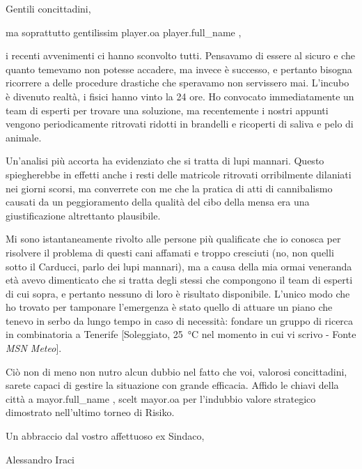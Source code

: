 \documentclass{letter}
\date{28 febbraio 2018}
\begin{document}
\begin{letter}{}
\opening{Gentili concittadini,}

ma soprattutto gentilissim{{ player.oa }} {{ player.full_name }},

i recenti avvenimenti ci hanno sconvolto tutti. Pensavamo di essere al sicuro e che quanto temevamo non potesse accadere, ma invece è successo, e pertanto bisogna ricorrere a delle procedure drastiche che speravamo non servissero mai. L'incubo è divenuto realtà, i fisici hanno vinto la 24 ore. Ho convocato immediatamente un team di esperti per trovare una soluzione, ma recentemente i nostri appunti vengono periodicamente ritrovati ridotti in brandelli e ricoperti di saliva e pelo di animale.

Un'analisi più accorta ha evidenziato che si tratta di lupi mannari. Questo spiegherebbe in effetti anche i resti delle matricole ritrovati orribilmente dilaniati nei giorni scorsi, ma converrete con me che la pratica di atti di cannibalismo causati da un peggioramento della qualità del cibo della mensa era una giustificazione altrettanto plausibile.

Mi sono istantaneamente rivolto alle persone più qualificate che io conosca per risolvere il problema di questi cani affamati e troppo cresciuti (no, non quelli sotto il Carducci, parlo dei lupi mannari), ma a causa della mia ormai veneranda età avevo dimenticato che si tratta degli stessi che compongono il team di esperti di cui sopra, e pertanto nessuno di loro è risultato disponibile. L'unico modo che ho trovato per tamponare l'emergenza è stato quello di attuare un piano che tenevo in serbo da lungo tempo in caso di necessità: fondare un gruppo di ricerca in combinatoria a Tenerife [Soleggiato, \SI{25}{\celsius} nel momento in cui vi scrivo - Fonte \emph{MSN Meteo}].

Ciò non di meno non nutro alcun dubbio nel fatto che voi, valorosi concittadini, sarete capaci di gestire la situazione con grande efficacia. Affido le chiavi della città a {{ mayor.full_name }}, scelt{{ mayor.oa }} per l'indubbio valore strategico dimostrato nell'ultimo torneo di Risiko.

Un abbraccio dal vostro affettuoso ex Sindaco,

\bigskip

\noindent Alessandro Iraci

\end{letter}
\end{document}
